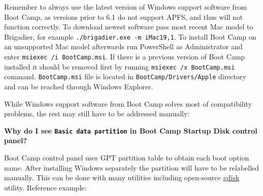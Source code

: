 \documentclass[]{article}
\providecommand{\DIFaddtex}[1]{{\protect\color{blue}\uwave{#1}}} %
\providecommand{\DIFdeltex}[1]{{\protect\color{red}\sout{#1}}}                      %
\providecommand{\DIFaddbegin}{\global\booltrue{DIFkeeppage}\global\booltrue{DIFchange}} %
\providecommand{\DIFaddend}{\global\booltrue{DIFkeeppage}\global\boolfalse{DIFchange}} %
\providecommand{\DIFdelbegin}{\global\booltrue{DIFkeeppage}\global\booltrue{DIFchange}} %
\providecommand{\DIFdelend}{\global\booltrue{DIFkeeppage}\global\boolfalse{DIFchange}} %
\providecommand{\DIFadd}[1]{\texorpdfstring{\DIFaddtex{#1}}{#1}} %
\providecommand{\DIFdel}[1]{\texorpdfstring{\DIFdeltex{#1}}{}} %
\begin{document}
  Remember to always use the latest version of Windows support software from Boot Camp,
  as versions prior to 6.1 do not support APFS, and thus will not function correctly.
  To download newest software pass most recent Mac model to Brigadier, for example
  \texttt{./brigadier.exe -m iMac19,1}. To install Boot Camp on an unsupported Mac model
  afterwards run PowerShell as Administrator and enter \texttt{msiexec /i BootCamp.msi}.
  If there is a previous version of Boot Camp installed it should be
  removed first by running \texttt{msiexec /x BootCamp.msi} command. \texttt{BootCamp.msi}
  file is located in \texttt{BootCamp/Drivers/Apple} directory and can be reached through
  Windows Explorer.

  While Windows support software from Boot Camp solves most of compatibility problems,
  the rest may still have to be addressed manually:


  \textbf{Why do I see \texttt{Basic data partition} in Boot Camp Startup Disk control panel?}

  Boot Camp control panel uses GPT partition table to obtain each boot option name.
  After installing Windows separately the partition will have to be relabelled manually.
  This can be done with many utilities including open-source
  \href{https://sourceforge.net/projects/gptfdisk}{gdisk} utility. Reference example:
\end{document}
